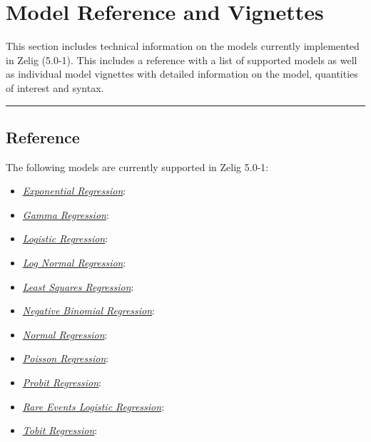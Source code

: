 \documentclass[letterpaper,10pt,english]{sphinxmanual}
\begin{document}
\chapter{Model Reference and Vignettes}
\label{vignette:vignettes}\label{vignette:model-reference-and-vignettes}\label{vignette::doc}
This section includes technical information on the models currently implemented in Zelig (5.0-1). This includes a reference with a list of supported models as well as individual model vignettes with detailed information on the model, quantities of interest and syntax.


\bigskip\hrule{}\bigskip



\section{Reference}
\label{vignette:reference}
The following models are currently supported in Zelig 5.0-1:
\begin{itemize}
\item {} 
{\hyperref[zelig-exp:zexp]{\emph{Exponential Regression}}}: 

\item {} 
{\hyperref[zelig-gamma:zgamma]{\emph{Gamma Regression}}}: 

\item {} 
{\hyperref[zelig-logit:zlogit]{\emph{Logistic Regression}}}: 

\item {} 
{\hyperref[zelig-lognorm:zlognorm]{\emph{Log Normal Regression}}}: 

\item {} 
{\hyperref[zelig-ls:zls]{\emph{Least Squares Regression}}}: 

\item {} 
{\hyperref[zelig-negbin:znegbin]{\emph{Negative Binomial Regression}}}: 

\item {} 
{\hyperref[zelig-normal:znorm]{\emph{Normal Regression}}}: 

\item {} 
{\hyperref[zelig-poisson:zpoisson]{\emph{Poisson Regression}}}: 

\item {} 
{\hyperref[zelig-probit:zprobit]{\emph{Probit Regression}}}: 

\item {} 
{\hyperref[zelig-relogit:zrelogit]{\emph{Rare Events Logistic Regression}}}: 

\item {} 
{\hyperref[zelig-tobit:ztobit]{\emph{Tobit Regression}}}: 

\end{itemize}
\end{document}
